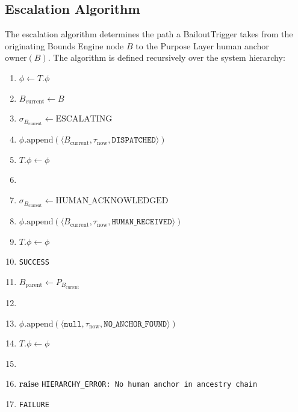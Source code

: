 \subsection{Escalation Algorithm}
\label{sec:escalation-algorithm}

The escalation algorithm determines the path a BailoutTrigger takes from the originating Bounds Engine node $B$ to the Purpose Layer human anchor $\text{owner}(B)$. The algorithm is defined recursively over the system hierarchy:

\bigskip

\begin{enumerate}[noitemsep]
\caption{BailoutTrigger Escalation Algorithm}
\label{alg:escalation}
\begin{enumerate}[noitemsep][1]

\item $\phi \leftarrow T.\phi$ 
\item $B_{\text{current}} \leftarrow B$ 

\item $\sigma_{B_{\text{current}}} \leftarrow \text{ESCALATING}$
\item $\phi.\text{append}(\langle B_{\text{current}}, \tau_{\text{now}}, \texttt{DISPATCHED} \rangle)$
\item $T.\phi \leftarrow \phi$

\item {}
\item $\sigma_{B_{\text{current}}} \leftarrow \text{HUMAN\_ACKNOWLEDGED}$
\item $\phi.\text{append}(\langle B_{\text{current}}, \tau_{\text{now}}, \texttt{HUMAN\_RECEIVED} \rangle)$
\item $T.\phi \leftarrow \phi$
\item \Return \texttt{SUCCESS}
 

\item $B_{\text{parent}} \leftarrow P_{B_{\text{current}}}$

\item {}
\item $\phi.\text{append}(\langle \texttt{null}, \tau_{\text{now}}, \texttt{NO\_ANCHOR\_FOUND} \rangle)$
\item $T.\phi \leftarrow \phi$
\item \item \textbf{raise} \texttt{HIERARCHY\_ERROR: No human anchor in ancestry chain}
\item \Return \texttt{FAILURE}
 


\end{enumerate}
\end{enumerate}
